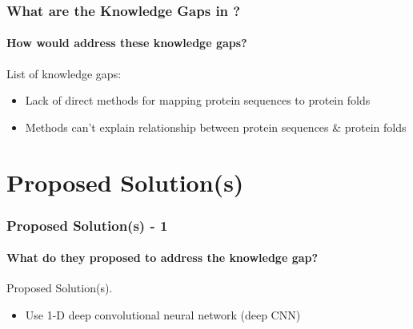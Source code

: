 \documentclass[xcolor={usenames,dvipsnames},hyperref={hyperindex,bookmarks}]{beamer}
\begin{document}







\frame
{
	\frametitle{What are the Knowledge Gaps in \cite{Hou2018}?}
	\framesubtitle{How would \cite{Hou2018} address these knowledge gaps?}

	List of knowledge gaps:
	\begin{itemize}
	\item Lack of direct methods for mapping protein sequences to protein folds
	\item Methods can't explain relationship between protein sequences \& protein folds
	\end{itemize}

}

























\section{Proposed Solution(s)}


\frame
{
	\frametitle{Proposed Solution(s) - 1}
	\framesubtitle{What do they proposed to address the knowledge gap?}

	Proposed Solution(s).
	\begin{itemize}
	\item Use 1-D deep convolutional neural network (deep CNN) 
	\end{itemize}
}
\end{document}
